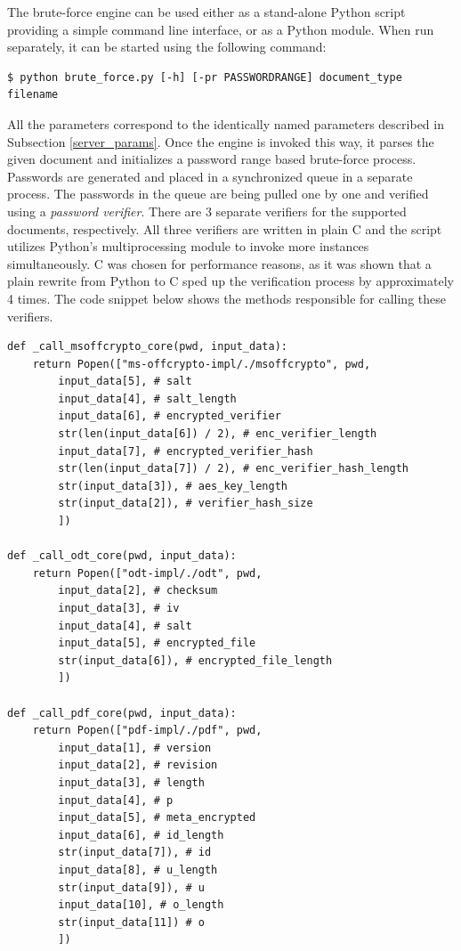 \documentclass[11pt,oneside]{fithesis2}
\begin{document}
The brute-force engine can be used either as a stand-alone Python script providing a simple command line interface, or as a Python module. When run separately, it can be started using the following command:

\begin{lstlisting}
$ python brute_force.py [-h] [-pr PASSWORDRANGE] document_type filename
\end{lstlisting}

All the parameters correspond to the identically named parameters described in Subsection \ref{server_params}. Once the engine is invoked this way, it parses the given document and initializes a password range based brute-force process. Passwords are generated and placed in a synchronized queue in a separate process. The passwords in the queue are being pulled one by one and verified using a \textit{password verifier}. There are 3 separate verifiers for the supported documents, respectively. All three verifiers are written in plain C and the script utilizes Python's multiprocessing module to invoke more instances simultaneously. C was chosen for performance reasons, as it was shown that a plain rewrite from Python to C sped up the verification process by approximately 4 times. The code snippet below shows the methods responsible for calling these verifiers.

\begin{lstlisting}
def _call_msoffcrypto_core(pwd, input_data):
    return Popen(["ms-offcrypto-impl/./msoffcrypto", pwd, 
        input_data[5], # salt
        input_data[4], # salt_length
        input_data[6], # encrypted_verifier
        str(len(input_data[6]) / 2), # enc_verifier_length
        input_data[7], # encrypted_verifier_hash
        str(len(input_data[7]) / 2), # enc_verifier_hash_length
        str(input_data[3]), # aes_key_length
        str(input_data[2]), # verifier_hash_size
        ])

def _call_odt_core(pwd, input_data):
    return Popen(["odt-impl/./odt", pwd, 
        input_data[2], # checksum
        input_data[3], # iv
        input_data[4], # salt
        input_data[5], # encrypted_file
        str(input_data[6]), # encrypted_file_length
        ]) 

def _call_pdf_core(pwd, input_data):
    return Popen(["pdf-impl/./pdf", pwd, 
        input_data[1], # version
        input_data[2], # revision
        input_data[3], # length
        input_data[4], # p
        input_data[5], # meta_encrypted 
        input_data[6], # id_length 
        str(input_data[7]), # id
        input_data[8], # u_length 
        str(input_data[9]), # u 
        input_data[10], # o_length
        str(input_data[11]) # o
        ]) 
\end{lstlisting}
\end{document}

